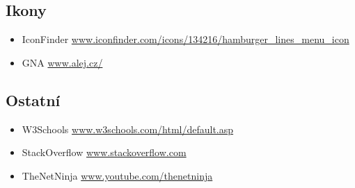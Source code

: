 \subsection{Ikony}

\begin{itemize}
\tightlist
\item IconFinder \href{https://www.iconfinder.com/icons/134216/hamburger_lines_menu_icon}{www.iconfinder.com/icons/134216/hamburger\_lines\_menu\_icon}
\item GNA \href{https://www.alej.cz/}{www.alej.cz/}
\end{itemize}

\subsection{Ostatní}

\begin{itemize}
\tightlist
\item W3Schools \href{https://www.w3schools.com/html/default.asp}{www.w3schools.com/html/default.asp}
\item StackOverflow \href{https://stackoverflow.com/}{www.stackoverflow.com}
\item TheNetNinja \href{https://www.youtube.com/thenetninja}{www.youtube.com/thenetninja}
\end{itemize}